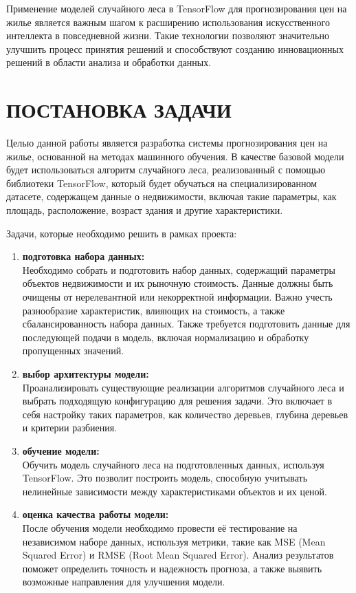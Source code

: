 {{Применение моделей случайного леса в TensorFlow для прогнозирования цен на жилье является важным шагом к расширению использования искусственного интеллекта в повседневной жизни. Такие технологии позволяют значительно улучшить процесс принятия решений и способствуют созданию инновационных решений в области анализа и обработки данных.
    }
    \newpage

\newpage
\section{\MakeUppercase{Постановка задачи}}

Целью данной работы является разработка системы прогнозирования цен на жилье, основанной на методах машинного обучения. В качестве базовой модели будет использоваться алгоритм случайного леса, реализованный с помощью библиотеки TensorFlow, который будет обучаться на специализированном датасете, содержащем данные о недвижимости, включая такие параметры, как площадь, расположение, возраст здания и другие характеристики.

Задачи, которые необходимо решить в рамках проекта:
\begin{enumerate}
    \item \textbf{подготовка набора данных:} \\
    Необходимо собрать и подготовить набор данных, содержащий параметры объектов недвижимости и их рыночную стоимость. Данные должны быть очищены от нерелевантной или некорректной информации. Важно учесть разнообразие характеристик, влияющих на стоимость, а также сбалансированность набора данных. Также требуется подготовить данные для последующей подачи в модель, включая нормализацию и обработку пропущенных значений. 
    \item \textbf{выбор архитектуры модели:} \\
    Проанализировать существующие реализации алгоритмов случайного леса и выбрать подходящую конфигурацию для решения задачи. Это включает в себя настройку таких параметров, как количество деревьев, глубина деревьев и критерии разбиения.
    \item \textbf{обучение модели:} \\
    Обучить модель случайного леса на подготовленных данных, используя TensorFlow. Это позволит построить модель, способную учитывать нелинейные зависимости между характеристиками объектов и их ценой.
    \item \textbf{оценка качества работы модели:} \\
    После обучения модели необходимо провести её тестирование на независимом наборе данных, используя метрики, такие как MSE (Mean Squared Error) и RMSE (Root Mean Squared Error). Анализ результатов поможет определить точность и надежность прогноза, а также выявить возможные направления для улучшения модели.
\end{enumerate}

}
